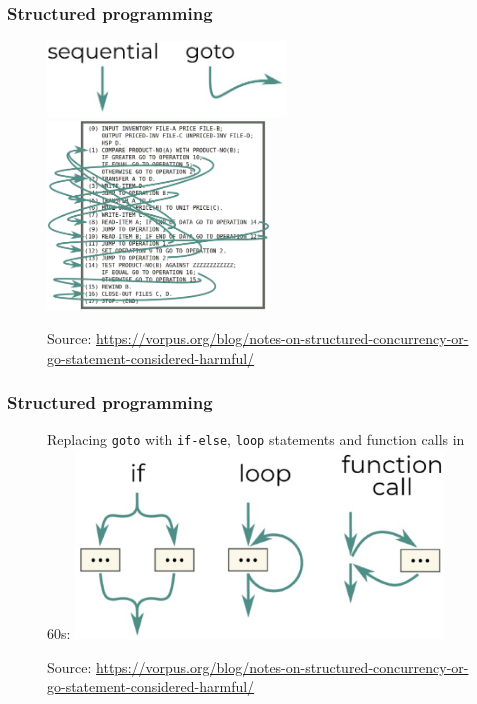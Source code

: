 \documentclass[10pt,utf8]{beamer}
\begin{document}
\begin{frame}
    \frametitle{Structured programming}
    \begin{figure}
        \centering
        \includegraphics[height=2cm]{./img/goto.eps}
        \includegraphics[height=5cm]{./img/goto_example.eps}
        \caption{\tiny{Source: \url{https://vorpus.org/blog/notes-on-structured-concurrency-or-go-statement-considered-harmful/}}}
    \end{figure}
\end{frame}

\begin{frame}
    \frametitle{Structured programming}
    \begin{figure}
        \centering
        Replacing \texttt{goto} with  \texttt{if-else}, \texttt{loop} statements and function calls in 60s:
        \includegraphics[height=5cm]{./img/structured.eps}
        \caption{\tiny{Source: \url{https://vorpus.org/blog/notes-on-structured-concurrency-or-go-statement-considered-harmful/}}}
    \end{figure}
\end{frame}
\end{document}

